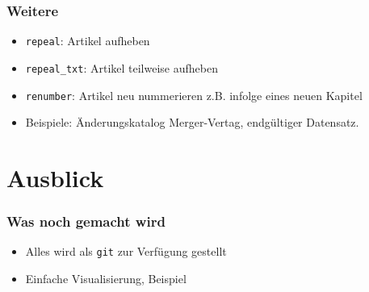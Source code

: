 \documentclass[xcolor=dvipsnames]{beamer} %
\begin{document}
\begin{frame}
  \frametitle{Weitere}
  \begin{itemize}
  \item \texttt{repeal}: Artikel aufheben
  \item \texttt{repeal\_txt}: Artikel teilweise aufheben
  \item \texttt{renumber}: Artikel neu nummerieren z.B. infolge eines neuen
    Kapitel      
  \item Beispiele: Änderungskatalog Merger-Vertag, endgültiger Datensatz.
  \end{itemize}
\end{frame}

\section{Ausblick}
\begin{frame}
  \frametitle{Was noch gemacht wird}
  \begin{itemize}
  \item Alles wird als \texttt{git} zur Verfügung gestellt
  \item Einfache Visualisierung, Beispiel
  \end{itemize}
\end{frame}
\end{document}
